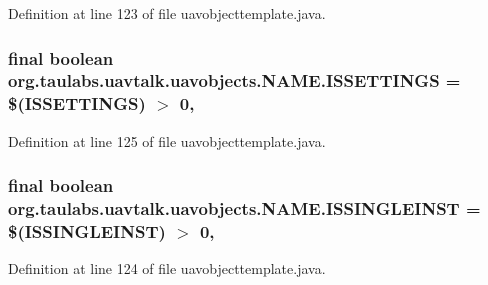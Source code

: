 Definition at line 123 of file uavobjecttemplate.\-java.

\hypertarget{classorg_1_1taulabs_1_1uavtalk_1_1uavobjects_1_1_n_a_m_e_adf60b0b2d0e32fa1f7b03be20e2bd9d0}{
\subsubsection[{I\-S\-S\-E\-T\-T\-I\-N\-G\-S}]{\setlength{\rightskip}{0pt plus 5cm}final boolean org.\-taulabs.\-uavtalk.\-uavobjects.\-N\-A\-M\-E.\-I\-S\-S\-E\-T\-T\-I\-N\-G\-S = \$(I\-S\-S\-E\-T\-T\-I\-N\-G\-S) $>$ 0\hspace{0.3cm}{\ttfamily [static]}, {\ttfamily [protected]}}}\label{classorg_1_1taulabs_1_1uavtalk_1_1uavobjects_1_1_n_a_m_e_adf60b0b2d0e32fa1f7b03be20e2bd9d0}


Definition at line 125 of file uavobjecttemplate.\-java.

\hypertarget{classorg_1_1taulabs_1_1uavtalk_1_1uavobjects_1_1_n_a_m_e_af3f4d99486bc619bb1a39e7e5454a064}{
\subsubsection[{I\-S\-S\-I\-N\-G\-L\-E\-I\-N\-S\-T}]{\setlength{\rightskip}{0pt plus 5cm}final boolean org.\-taulabs.\-uavtalk.\-uavobjects.\-N\-A\-M\-E.\-I\-S\-S\-I\-N\-G\-L\-E\-I\-N\-S\-T = \$(I\-S\-S\-I\-N\-G\-L\-E\-I\-N\-S\-T) $>$ 0\hspace{0.3cm}{\ttfamily [static]}, {\ttfamily [protected]}}}\label{classorg_1_1taulabs_1_1uavtalk_1_1uavobjects_1_1_n_a_m_e_af3f4d99486bc619bb1a39e7e5454a064}


Definition at line 124 of file uavobjecttemplate.\-java.

